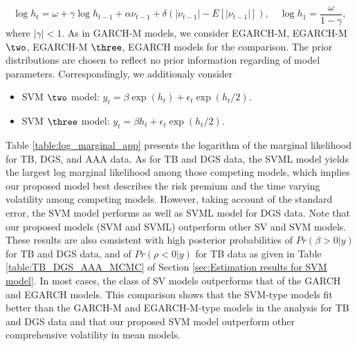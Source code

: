 \begin{equation*}
    \log h_t = \omega + \gamma \log h_{t-1} + \alpha \nu_{t-1} + \delta (|\nu_{t-1}| - E[|\nu_{t-1}|]), \quad
    \log h_1 = \frac{\omega}{1 - \gamma}, 
\end{equation*}
where $|\gamma| < 1$. As in GARCH-M models, we consider EGARCH-M, EGARCH-M $\two$, EGARCH-M $\three$, EGARCH models for the comparison. The prior distributions are chosen to reflect no prior information regarding of model parameters. Correspondingly, we additionaly consider
\begin{itemize}
    \item SVM $\two$ model: $y_t = \beta \exp(h_t) + \epsilon_t\exp(h_t/2)$.
    \item SVM $\three$ model: $y_t = \beta h_t + \epsilon_t\exp(h_t/2)$.
\end{itemize}
Table \ref{table:log_marginal_app} presents the logarithm of the marginal likelihood for  TB, DGS, and AAA data.  
As for TB and DGS data, the SVML model yields the largest log marginal likelihood among those competing models, which implies our proposed model best describes the risk premium and the time varying volatility among competing models. However, taking account of the standard error, the SVM model performs as well as SVML model for DGS data. Note that our proposed models (SVM and SVML) outperform other SV and SVM models. 
These results are also consistent with high posterior probabilities of $Pr(\beta > 0|y) $ for TB and DGS data, and of $Pr(\rho< 0|y)$ for TB data 
as given in Table \ref{table:TB_DGS_AAA_MCMC} of Section \ref{sec:Estimation results for SVM model}.
In most cases, the class of SV models outperforms that of the GARCH and EGARCH models. This comparison shows that the SVM-type models fit better than the GARCH-M and EGARCH-M-type models in the analysis for TB and DGS data and that our proposed SVM model outperform other comprehensive volatility in mean models.

